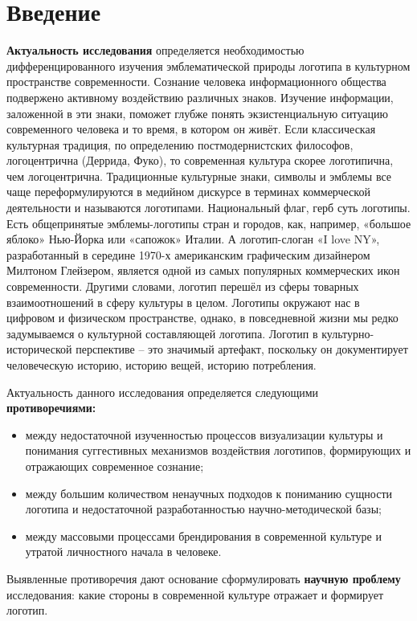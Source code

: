 \section{Введение}

\textbf{Актуальность исследования} определяется необходимостью дифференцированного изучения эмблематической природы логотипа в культурном пространстве современности. Сознание человека информационного общества подвержено активному воздействию различных знаков. Изучение информации, заложенной в эти знаки, поможет глубже понять экзистенциальную ситуацию современного человека и то время, в котором он живёт. Если классическая культурная традиция, по определению постмодернистских философов, логоцентрична (Деррида, Фуко), то современная культура скорее логотипична, чем логоцентрична. Традиционные культурные знаки, символы и эмблемы все чаще переформулируются в медийном дискурсе в терминах коммерческой деятельности и называются логотипами. Национальный флаг, герб суть логотипы. Есть общепринятые эмблемы-логотипы стран и городов, как, например, «большое яблоко» Нью-Йорка или «сапожок» Италии. А логотип-слоган «I love NY», разработанный в середине 1970-х американским графическим дизайнером Милтоном Глейзером, является одной из самых популярных коммерческих икон современности. Другими словами, логотип перешёл из сферы товарных взаимоотношений в сферу культуры в целом. Логотипы окружают нас в цифровом и физическом пространстве, однако, в повседневной жизни мы редко задумываемся о культурной составляющей логотипа. Логотип в культурно-исторической перспективе – это значимый артефакт, поскольку он документирует человеческую историю, историю вещей, историю потребления.

Актуальность данного исследования определяется следующими \textbf{противоречиями:}
\begin{itemize}
\item между недостаточной изученностью процессов визуализации культуры и понимания суггестивных механизмов воздействия логотипов, формирующих и отражающих современное сознание;
\item между большим количеством ненаучных подходов к пониманию сущности логотипа и недостаточной разработанностью научно-методической базы;
\item между массовыми процессами брендирования в современной культуре и утратой личностного начала в человеке.
\end{itemize}

Выявленные противоречия дают основание сформулировать \textbf{научную проблему} исследования: какие стороны в современной культуре отражает и формирует логотип.

